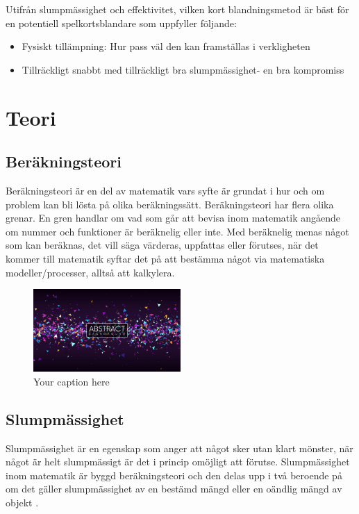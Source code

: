 \documentclass[a4paper]{article}
\begin{document}
Utifrån slumpmässighet och effektivitet, vilken kort blandningsmetod är bäst för
en potentiell spelkortsblandare som uppfyller följande:
\begin{itemize}
	\item Fysiskt tillämpning: Hur pass väl den kan framställas i verkligheten 
	\item Tillräckligt snabbt med tillräckligt bra slumpmässighet- en bra
		kompromiss
\end{itemize}
\section{Teori}
\subsection{Beräkningsteori}

Beräkningsteori är en del av matematik vars syfte är grundat i hur och om
problem kan bli lösta på olika beräkningssätt. Beräkningsteori har flera olika
grenar. En gren handlar om vad som går att bevisa inom matematik angående om
nummer och funktioner är beräknelig eller inte. Med beräknelig menas något som
kan beräknas, det vill säga värderas, uppfattas eller förutses, när det kommer
till matematik syftar det på att bestämma något via matematiska
modeller/processer, alltså att kalkylera.

\begin{figure}[h]
  \centering
  \includegraphics[width=0.5\textwidth]{images/test.jpg}
  \caption{Your caption here}
  \label{fig: a very cool test image}
\end{figure}

\subsection{Slumpmässighet}

Slumpmässighet är en egenskap som anger att något sker utan klart mönster, när
något är helt slumpmässigt är det i princip omöjligt att förutse. Slumpmässighet
inom matematik är byggd beräknings\-teori och den delas upp i två beroende på om
det gäller slumpmässighet av en bestämd mängd eller en oändlig mängd av objekt
\parencite{Terwijn2016}.
\end{document}
